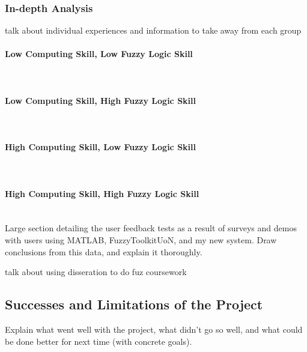 {\subsubsection{In-depth Analysis}
{
\color{red}
talk about individual experiences and information to take away from each group
}

\paragraph{Low Computing Skill, Low Fuzzy Logic Skill}\ \\
\paragraph{Low Computing Skill, High Fuzzy Logic Skill}\ \\
\paragraph{High Computing Skill, Low Fuzzy Logic Skill}\ \\
\paragraph{High Computing Skill, High Fuzzy Logic Skill}\ \\

{\color{red}
Large section detailing the user feedback tests as a result of surveys and demos with users using MATLAB, FuzzyToolkitUoN, and my new system. Draw conclusions from this data, and explain it thoroughly.
}
 


{\color{red} 

talk about using disseration to do fuz coursework
}




\subsection{Successes and Limitations of the Project}
{\color{red} 
Explain what went well with the project, what didn't go so well, and what could be done better for next time (with concrete goals).
}
}
